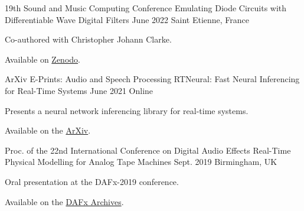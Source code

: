 \begin{cventries}
  \cventry
    {19th Sound and Music Computing Conference} %
    {Emulating Diode Circuits with Differentiable Wave Digital Filters} %
    {June 2022} %
    {Saint Etienne, France} %
    {
      \begin{cvitems} %
        \item {Co-authored with Christopher Johann Clarke.}
        \item {Available on \href{https://zenodo.org/record/6566846}{Zenodo}.}
      \end{cvitems}
    }

  \cventry
    {ArXiv E-Prints: Audio and Speech Processing} %
    {RTNeural: Fast Neural Inferencing for Real-Time Systems} %
    {June 2021} %
    {Online} %
    {
      \begin{cvitems} %
        \item {Presents a neural network inferencing library for real-time systems.}
        \item {Available on the \href{https://arxiv.org/pdf/2106.03037.pdf}{ArXiv}.}
      \end{cvitems}
    }


  \cventry
    {Proc. of the 22nd International Conference on Digital Audio Effects} %
    {Real-Time Physical Modelling for Analog Tape Machines} %
    {Sept. 2019} %
    {Birmingham, UK} %
    {
      \begin{cvitems} %
        \item {Oral presentation at the DAFx-2019 conference.}
        \item {Available on the \href{http://www.dafx.de/paper-archive/2019/DAFx2019_paper_3.pdf}{DAFx Archives}.}
      \end{cvitems}
    }


\end{cventries}
